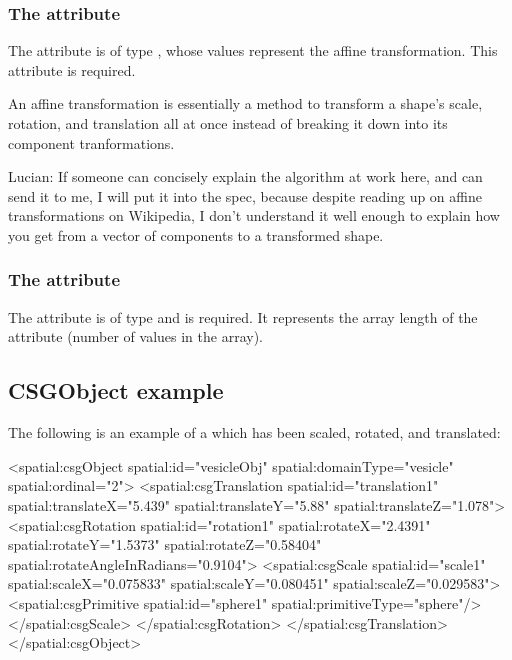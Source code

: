 \subsubsection{The \fixttspace{} attribute}
The  attribute is of type , whose values represent the affine transformation. This attribute is required.

An affine transformation is essentially a method to transform a shape's scale, rotation, and translation all at once instead of breaking it down into its component tranformations.

{\color{red} Lucian: \notice If someone can concisely explain the algorithm at work here, and can send it to me, I will put it into the spec, because despite reading up on affine transformations on Wikipedia, I don't understand it well enough to explain how you get from a vector of components to a transformed shape.}


\subsubsection{The \fixttspace{} attribute}
The  attribute is of type  and is required. It represents the array length of the  attribute (number of values in the  array).


\subsection{CSGObject example}
\label{csgobject-example}
The following is an example of a \CSGObject which has been scaled, rotated, and translated:

\begin{example}
  <spatial:csgObject spatial:id="vesicleObj" spatial:domainType="vesicle"
                     spatial:ordinal="2">
    <spatial:csgTranslation spatial:id="translation1" spatial:translateX="5.439"
                            spatial:translateY="5.88" spatial:translateZ="1.078">
      <spatial:csgRotation  spatial:id="rotation1" spatial:rotateX="2.4391"
                            spatial:rotateY="1.5373" spatial:rotateZ="0.58404"
                            spatial:rotateAngleInRadians="0.9104">
        <spatial:csgScale   spatial:id="scale1" spatial:scaleX="0.075833"
                            spatial:scaleY="0.080451" spatial:scaleZ="0.029583">
          <spatial:csgPrimitive spatial:id="sphere1" spatial:primitiveType="sphere"/>
       </spatial:csgScale>
      </spatial:csgRotation>
    </spatial:csgTranslation>
  </spatial:csgObject>
\end{example}

